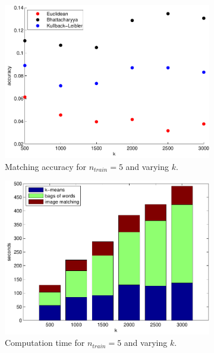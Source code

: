 \documentclass[11pt,a4paper]{article}
\begin{document}
\begin{figure}[H]
    \centering
    \begin{subfigure}[t]{0.48\textwidth}
        \includegraphics[width=\textwidth]{images/results_k.pdf}
        \caption{Matching accuracy for $n_{train} = 5$ and varying $k$.}
        \label{fig:results_k}
    \end{subfigure}
    \begin{subfigure}[t]{0.48\textwidth}
        \includegraphics[width=\textwidth]{images/results_k_time.pdf}
        \caption{Computation time for $n_{train} = 5$ and varying $k$.}
        \label{fig:results_k_time}
    \end{subfigure}
    \begin{subfigure}[t]{0.48\textwidth}

\end{subfigure}
\end{figure}
\end{document}

